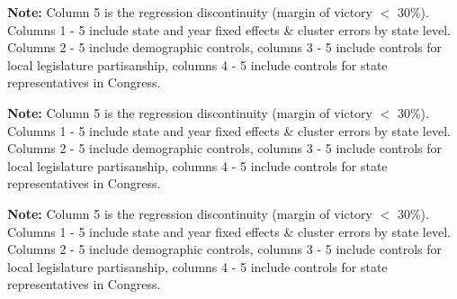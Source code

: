 \documentclass{article}
\begin{document}

\textbf{Note:} Column 5 is the regression discontinuity (margin of victory $<$ 30\%). Columns 1 - 5 include state and year fixed effects \& cluster errors by state level. Columns 2 - 5 include demographic controls, columns 3 - 5 include controls for local legislature partisanship, columns 4 - 5 include controls for state representatives in Congress.


\textbf{Note:} Column 5 is the regression discontinuity (margin of victory $<$ 30\%). Columns 1 - 5 include state and year fixed effects \& cluster errors by state level. Columns 2 - 5 include demographic controls, columns 3 - 5 include controls for local legislature partisanship, columns 4 - 5 include controls for state representatives in Congress.


\textbf{Note:} Column 5 is the regression discontinuity (margin of victory $<$ 30\%). Columns 1 - 5 include state and year fixed effects \& cluster errors by state level. Columns 2 - 5 include demographic controls, columns 3 - 5 include controls for local legislature partisanship, columns 4 - 5 include controls for state representatives in Congress.
\end{document}
